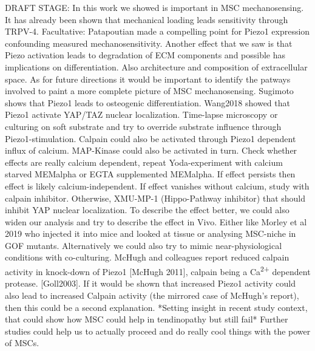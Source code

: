 DRAFT STAGE: 
In this work we showed \Piezo{} is important in MSC mechanosensing. It has already been shown that mechanical loading leads sensitivity through TRPV-4. Facultative: Patapoutian made a compelling point for Piezo1 expression confounding measured mechanosensitivity. Another effect that we saw is that Piezo activation leads to degradation of ECM components and possible has implications on differentiation. Also architecture and composition of extracellular space.
As for future directions it would be important to identify the patways involved to paint a more complete picture of MSC mechanosensing. Sugimoto shows that Piezo1 leads to osteogenic differentiation. Wang2018 showed that Piezo1 activate YAP/TAZ nuclear localization. Time-lapse microscopy or culturing on soft substrate and try to override substrate influence through Piezo1-stimulation. Calpain could also be activated through Piezo1 dependent influx of calcium. MAP-Kinase could also be activated in turn.  Check whether effects are really calcium dependent, repeat Yoda-experiment with calcium starved MEMalpha or EGTA supplemented MEMalpha. If effect persists then effect is likely calcium-independent. If effect vanishes without calcium, study with calpain inhibitor. Otherwise, XMU-MP-1 (Hippo-Pathway inhibitor) that should inhibit YAP nuclear localization. To describe the effect better, we could also widen our analysis and try to describe the effect in Vivo. Either like Morley et al 2019 who injected it into mice and looked at tissue or analysing MSC-niche in GOF mutants. Alternatively we could also try to mimic near-physiological conditions with co-culturing.
McHugh and colleagues report reduced calpain activity in knock-down of Piezo1 [McHugh 2011], calpain being a Ca\textsuperscript{2+} dependent protease. [Goll2003]. If it would be shown that increased Piezo1 activity could also lead to increased Calpain activity (the mirrored case of McHugh's report), then this could be a second explanation.
*Setting insight in recent study context, that could show how MSC could help in tendinopathy but still fail* Further studies could help us to actually proceed and do really cool things with the power of MSCs. 